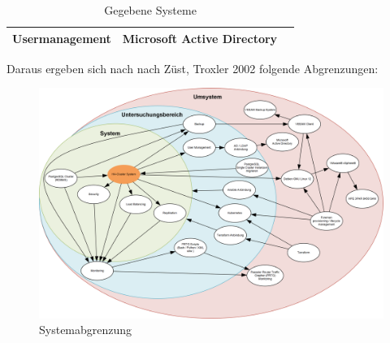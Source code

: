 \begin{table}[H]
{\begin{tabular}{lll}
    Usermanagement                            & Microsoft Active Directory                                                                  &                                                                                                                                                       \\ \hline
    \end{tabular}%
    }
    \caption{Gegebene Systeme}
    \label{tab:gegebene_systeme}
    \end{table}

    \begin{flushleft}
    Daraus ergeben sich nach nach Z\"ust, Troxler 2002\cite{EDGTQIKU} folgende Abgrenzungen:
    \end{flushleft}
    \begin{figure}[H]
        \centering
        \includegraphics[width=1\linewidth]{source/introduction/delimitations/systemabgrenzungen}
        \caption{Systemabgrenzung}
        \label{fig:systemabgrenzungen}
    \end{figure}
\clearpage
{}
\recalctypearea

